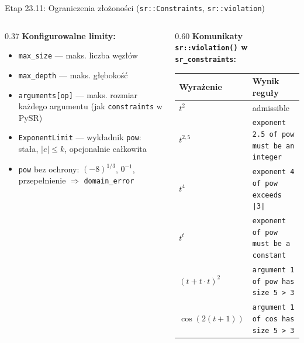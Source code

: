 \documentclass[
  polish,
  aspectratio=169,
]{beamer}
\begin{document}
\begin{frame}{Etap 23.11: Ograniczenia złożoności (\texttt{sr::Constraints}, \texttt{sr::violation})}
  \begin{columns}[T]
    \begin{column}{0.37\textwidth}
      \textbf{Konfigurowalne limity:}
      \begin{itemize}\footnotesize
        \item \texttt{max\_size} --- maks. liczba węzłów
        \item \texttt{max\_depth} --- maks. głębokość
        \item \texttt{arguments[op]} --- maks. rozmiar każdego argumentu (jak \texttt{constraints} w PySR)
        \item \texttt{ExponentLimit} --- wykładnik \texttt{pow}: stała, $|e| \le k$, opcjonalnie całkowita
        \item \texttt{pow} bez ochrony: $(-8)^{1/3}$, $0^{-1}$, przepełnienie $\Rightarrow$ \texttt{domain\_error}
      \end{itemize}
    \end{column}
    \begin{column}{0.60\textwidth}
      \textbf{Komunikaty \texttt{sr::violation()} w \texttt{sr\_constraints}:}\par\smallskip
      \scriptsize
      \begin{tabular}{@{}l l@{}}
        \toprule
        Wyrażenie & Wynik reguły \\
        \midrule
        $t^2$ & \textcolor{aghgreen}{admissible} \\
        $t^{2{,}5}$ & \texttt{exponent 2.5 of pow must be an integer} \\
        $t^4$ & \texttt{exponent 4 of pow exceeds |3|} \\
        $t^t$ & \texttt{exponent of pow must be a constant} \\
        $(t + t\cdot t)^2$ & \texttt{argument 1 of pow has size 5 > 3} \\
        $\cos(2(t+1))$ & \texttt{argument 1 of cos has size 5 > 3} \\
        \bottomrule
      \end{tabular}
    \end{column}
  \end{columns}
\end{frame}
\end{document}
